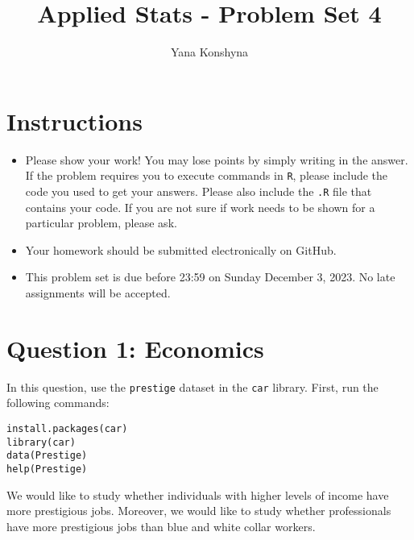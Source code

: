 \documentclass[12pt,letterpaper]{article}
\title{Applied Stats - Problem Set 4}
\author{Yana Konshyna}
\begin{document}
	\maketitle
	\section*{Instructions}
	\begin{itemize}
		\item Please show your work! You may lose points by simply writing in the answer. If the problem requires you to execute commands in \texttt{R}, please include the code you used to get your answers. Please also include the \texttt{.R} file that contains your code. If you are not sure if work needs to be shown for a particular problem, please ask.
		\item Your homework should be submitted electronically on GitHub.
		\item This problem set is due before 23:59 on Sunday December 3, 2023. No late assignments will be accepted.
	\end{itemize}



	\vspace{.5cm}
\section*{Question 1: Economics}
\vspace{.25cm}
\noindent 	
In this question, use the \texttt{prestige} dataset in the \texttt{car} library. First, run the following commands:

\begin{verbatim}
install.packages(car)
library(car)
data(Prestige)
help(Prestige)
\end{verbatim} 


\noindent We would like to study whether individuals with higher levels of income have more prestigious jobs. Moreover, we would like to study whether professionals have more prestigious jobs than blue and white collar workers.
\end{document}
